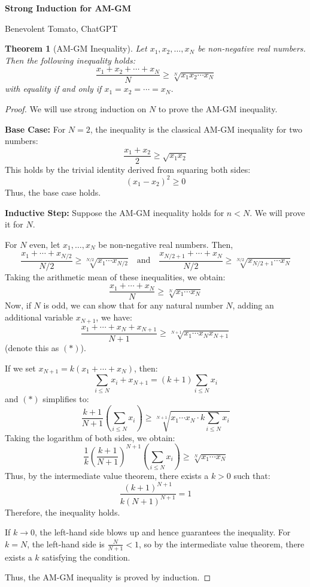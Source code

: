 \documentclass{article}
\theoremstyle{plain}
\newtheorem{theorem}{Theorem}
\begin{document}
\begin{center}
    \Large
    \textbf{Strong Induction for AM-GM}

    \large
    Benevolent Tomato, ChatGPT
\end{center}
\begin{theorem}[AM-GM Inequality]
Let $x_1, x_2, \dots, x_N$ be non-negative real numbers. Then the following inequality holds:
\[
\frac{x_1 + x_2 + \cdots + x_N}{N} \geq \sqrt[N]{x_1 x_2 \cdots x_N}
\]
with equality if and only if $x_1 = x_2 = \cdots = x_N$.
\end{theorem}

\begin{proof}
We will use strong induction on $N$ to prove the AM-GM inequality.

\textbf{Base Case:} For $N = 2$, the inequality is the classical AM-GM inequality for two numbers:
\[
\frac{x_1 + x_2}{2} \geq \sqrt{x_1 x_2}
\]
This holds by the trivial identity derived from squaring both sides:
\[
(x_1 - x_2)^2 \geq 0
\]
Thus, the base case holds.

\textbf{Inductive Step:} Suppose the AM-GM inequality holds for $n < N$. We will prove it for $N$.

For $N$ even, let $x_1, \dots, x_N$ be non-negative real numbers. Then,
\[
\frac{x_1 + \cdots + x_{N/2}}{N/2} \geq \sqrt[N/2]{x_1 \cdots x_{N/2}} \quad \text{and} \quad \frac{x_{N/2+1} + \cdots + x_N}{N/2} \geq \sqrt[N/2]{x_{N/2+1} \cdots x_N}
\]
Taking the arithmetic mean of these inequalities, we obtain:
\[
\frac{x_1 + \cdots + x_N}{N} \geq \sqrt[N]{x_1 \cdots x_N}
\]
Now, if $N$ is odd, we can show that for any natural number $N$, adding an additional variable $x_{N+1}$, we have:
\[
\frac{x_1 + \cdots + x_N + x_{N+1}}{N+1} \geq \sqrt[N+1]{x_1 \cdots x_N x_{N+1}}
\]
(denote this as $(*)$).

If we set $x_{N+1} = k(x_1 + \cdots + x_N)$, then:
\[
\sum_{i \leq N} x_i + x_{N+1} = (k+1) \sum_{i \leq N} x_i
\]
and $(*)$ simplifies to:
\[
\frac{k+1}{N+1} \left(\sum_{i \leq N} x_i \right) \geq \sqrt[N+1]{x_1 \cdots x_N \cdot k \sum_{i \leq N} x_i}
\]
Taking the logarithm of both sides, we obtain:
\[
\frac{1}{k}\left(\frac{k+1}{N+1}\right)^{N+1} \left(\sum_{i \leq N} x_i \right) \geq \sqrt[N]{x_1 \cdots x_N}
\]
Thus, by the intermediate value theorem, there exists a $k > 0$ such that:
\[
\frac{(k+1)^{N+1}}{k(N+1)^{N+1}} = 1
\]
Therefore, the inequality holds.

If $k \to 0$, the left-hand side blows up and hence guarantees the inequality. For $k = N$, the left-hand side is $\frac{N}{N+1} < 1$, so by the intermediate value theorem, there exists a $k$ satisfying the condition.

Thus, the AM-GM inequality is proved by induction.
\end{proof}
\end{document}
